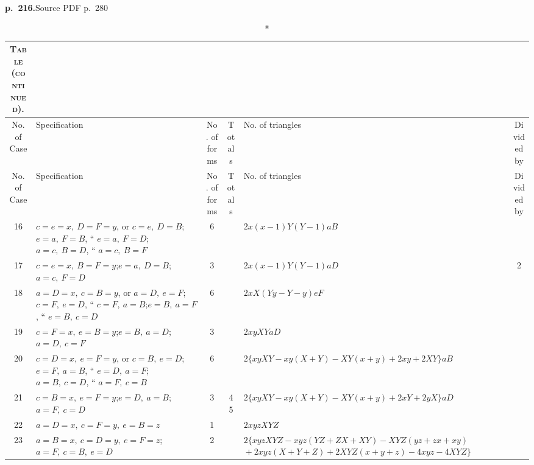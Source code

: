 \documentclass[11pt,a4paper]{article}
\newcommand{\sourcepage}[2]{\par\bigskip\noindent\textbf{p.~#1.}\hfill{\footnotesize Source PDF p.~#2}\par\nobreak\medskip}
\begin{document}
\clearpage
\sourcepage{216}{280}
\begin{landscape}
\begin{center}
\small
\begin{longtable}{c p{8.2cm} c c p{8.2cm} c}
\caption*{\textsc{Table (continued).}}\\
\toprule
No. of Case&Specification&No. of forms&Totals&No. of triangles&Divided by\\
\midrule
\endfirsthead
\toprule
No. of Case&Specification&No. of forms&Totals&No. of triangles&Divided by\\
\midrule
\endhead
16&$c=e=x,\ D=F=y$, or $c=e,\ D=B$;\quad $e=a,\ F=B$, `` $e=a,\ F=D$;\quad $a=c,\ B=D$, `` $a=c,\ B=F$&6&&$2x(x-1)Y(Y-1)aB$&\\
17&$c=e=x,\ B=F=y$;\quad $e=a,\ D=B$;\quad $a=c,\ F=D$&3&&$2x(x-1)Y(Y-1)aD$&2\\
18&$a=D=x,\ c=B=y$, or $a=D,\ e=F$;\quad $c=F,\ e=D$, `` $c=F,\ a=B$;\quad $e=B,\ a=F$, `` $e=B,\ c=D$&6&&$2xX(Yy-Y-y)eF$&\\
19&$c=F=x,\ e=B=y$;\quad $e=B,\ a=D$;\quad $a=D,\ c=F$&3&&$2xyXYaD$&\\
20&$c=D=x,\ e=F=y$, or $c=B,\ e=D$;\quad $e=F,\ a=B$, `` $e=D,\ a=F$;\quad $a=B,\ c=D$, `` $a=F,\ c=B$&6&&$2\{xyXY-xy(X+Y)-XY(x+y)+2xy+2XY\}aB$&\\
21&$c=B=x,\ e=F=y$;\quad $e=D,\ a=B$;\quad $a=F,\ c=D$&3&45&$2\{xyXY-xy(X+Y)-XY(x+y)+2xY+2yX\}aD$&\\
22&$a=D=x,\ c=F=y,\ e=B=z$&1&&$2xyzXYZ$&\\
23&$a=B=x,\ c=D=y,\ e=F=z$;\quad $a=F,\ c=B,\ e=D$&2&&$2\{xyzXYZ-xyz(YZ+ZX+XY)-XYZ(yz+zx+xy)$\newline ${}+2xyz(X+Y+Z)+2XYZ(x+y+z)-4xyz-4XYZ\}$&\\
\bottomrule
\end{longtable}
\end{center}
\end{landscape}
\end{document}

